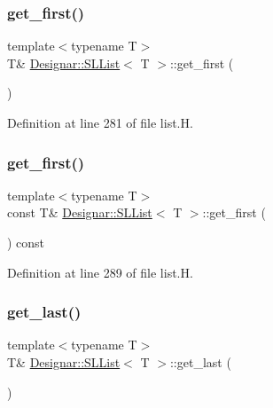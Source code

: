 \subsubsection{\texorpdfstring{get\+\_\+first()}{get\_first()}\hspace{0.1cm}{\footnotesize\ttfamily [1/2]}}
{\footnotesize\ttfamily template$<$typename T$>$ \\
T\& \hyperlink{class_designar_1_1_s_l_list}{Designar\+::\+S\+L\+List}$<$ T $>$\+::get\+\_\+first (\begin{DoxyParamCaption}{ }\end{DoxyParamCaption})\hspace{0.3cm}{\ttfamily [inline]}}



Definition at line 281 of file list.\+H.

\mbox{\label{class_designar_1_1_s_l_list_a2924b50936033843d23b2d384e751953}} 
\subsubsection{\texorpdfstring{get\+\_\+first()}{get\_first()}\hspace{0.1cm}{\footnotesize\ttfamily [2/2]}}
{\footnotesize\ttfamily template$<$typename T$>$ \\
const T\& \hyperlink{class_designar_1_1_s_l_list}{Designar\+::\+S\+L\+List}$<$ T $>$\+::get\+\_\+first (\begin{DoxyParamCaption}{ }\end{DoxyParamCaption}) const\hspace{0.3cm}{\ttfamily [inline]}}



Definition at line 289 of file list.\+H.

\mbox{\label{class_designar_1_1_s_l_list_ae56fe90795b8fb280bc7361a2426fe53}} 
\subsubsection{\texorpdfstring{get\+\_\+last()}{get\_last()}\hspace{0.1cm}{\footnotesize\ttfamily [1/2]}}
{\footnotesize\ttfamily template$<$typename T$>$ \\
T\& \hyperlink{class_designar_1_1_s_l_list}{Designar\+::\+S\+L\+List}$<$ T $>$\+::get\+\_\+last (\begin{DoxyParamCaption}{ }\end{DoxyParamCaption})\hspace{0.3cm}{\ttfamily [inline]}}



